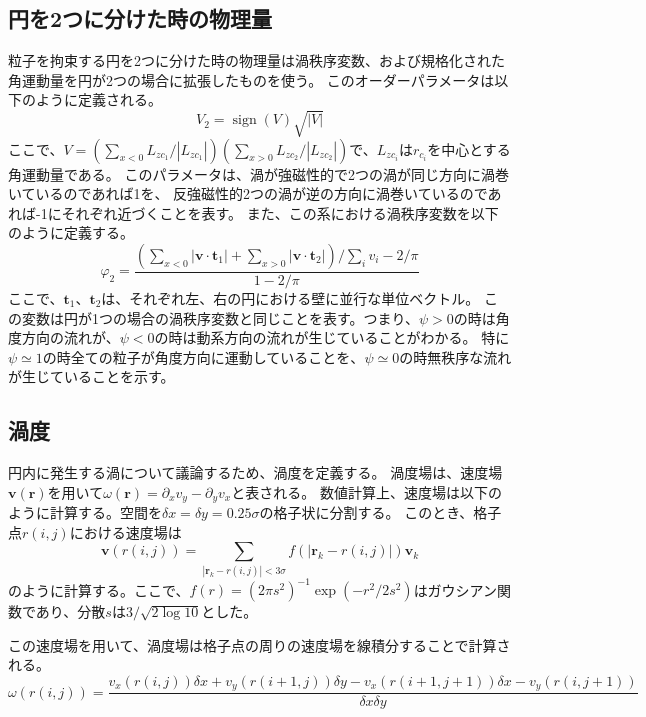 \documentclass[/Users/ikedahajime/GitHub/reserch/master_report/thesis]{subfiles}
\begin{document}
\subsection{円を2つに分けた時の物理量}
粒子を拘束する円を2つに分けた時の物理量は渦秩序変数、および規格化された角運動量を円が2つの場合に拡張したものを使う。
このオーダーパラメータは以下のように定義される。
\begin{equation}
    V_2={\mathop{\mathrm{sign}}\nolimits} (V)\sqrt{|V|}
\end{equation}
ここで、$V=(\sum_{x<0} L_{zc_1}/|L_{zc_1}|)(\sum_{x>0}L_{zc_2}/|L_{zc_2}|)$で、$L_{zc_i}$は$r_{c_i}$を中心とする角運動量である。
このパラメータは、渦が強磁性的で2つの渦が同じ方向に渦巻いているのであれば1を、
反強磁性的2つの渦が逆の方向に渦巻いているのであれば-1にそれぞれ近づくことを表す。
また、この系における渦秩序変数を以下のように定義する。
\begin{equation}
    \varphi_2=\frac{(\sum_{x<0} \left|\bm{v}\cdot \bm{t}_{1} \right|+\sum_{x>0} \left|\bm{v}\cdot \bm{t}_{2} \right|)/\sum_i v_i -2/\pi}{1-2/\pi}
\end{equation}
ここで、$\bm{t}_1、\bm{t}_2$は、それぞれ左、右の円における壁に並行な単位ベクトル。
この変数は円が1つの場合の渦秩序変数と同じことを表す。つまり、$\psi>0$の時は角度方向の流れが、$\psi<0$の時は動系方向の流れが生じていることがわかる。
特に$\psi\simeq1$の時全ての粒子が角度方向に運動していることを、$\psi\simeq0$の時無秩序な流れが生じていることを示す。




\subsection{渦度}\label{subsec:def_vortex}
円内に発生する渦について議論するため、渦度を定義する。
渦度場は、速度場$\bm{v}(\bm{r})$を用いて$\omega(\bm{r})=\partial_x v_y -\partial_y v_x$と表される。
数値計算上、速度場は以下のように計算する。空間を$\delta x=\delta y=0.25 \sigma$の格子状に分割する。
このとき、格子点$r(i,j)$における速度場は%
\begin{equation}\label{eq:valocity_field}
    \bm{v}(r(i,j))=\sum_{\left|\bm{r}_k-r(i,j)\right|<3\sigma} f(\left|\bm{r}_k-r(i,j)\right|)\bm{v}_k
\end{equation}
のように計算する。ここで、$f(r)=(2\pi s^2)^{-1} \exp(-r^2/2s^2)$はガウシアン関数であり、分散$s$は$3/\sqrt{2\log 10}$とした。


この速度場を用いて、渦度場は格子点の周りの速度場を線積分することで計算される。
\begin{equation}
    \omega (r(i,j))=\frac{v_x(r(i,j))\delta x +v_y(r(i+1,j)) \delta y -v_x(r(i+1,j+1))\delta x -v_y(r(i,j+1))}{\delta x \delta y}
\end{equation}
\end{document}
